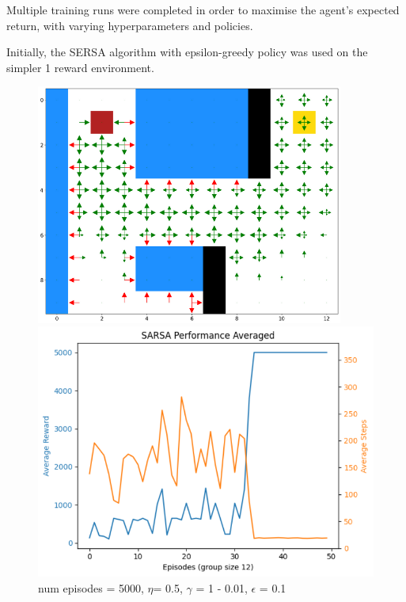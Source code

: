 \documentclass[12pt]{article}
\begin{document}
Multiple training runs were completed in order to maximise the agent’s expected return, with varying hyperparameters and policies.
\clearpage

Initially, the SERSA algorithm with epsilon-greedy policy was used on the simpler 1 reward environment.
\vspace{10pt}


\begin{figure}
  \centering
\begin{minipage}{.28\textwidth}
  \includegraphics[width=0.9\textwidth]{1 Q plot.png}
  \caption{  num episodes = 5000, $\eta$= 0.5, $\gamma$ = 1 - 0.01, $\epsilon$ = 0.1}
\end{minipage}%
\begin{minipage}{.32\textwidth}
  \centering
  \includegraphics[width=1\textwidth]{10 performance plot.png}
\end{minipage}
\end{figure}
\end{document}
